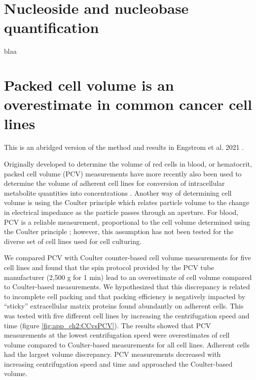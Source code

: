 \chapter{Nucleoside and nucleobase quantification}
blaa




















\chapter{Packed cell volume is an overestimate in common cancer cell lines}
\label{app_ch2_cell_vol}
This is an abridged version of the method and results in Engstrom et al. 2021 \cite{Engstrom2021-az}.

Originally developed to determine the volume of red cells in blood, or hematocrit, packed cell volume (PCV) measurements have more recently also been used to determine the volume of adherent cell lines for conversion of intracellular metabolite quantities into concentrations \cite{Park2016-ap, Liu2018-it, Yang2020-fs, Ghergurovich2020-nb}.
Another way of determining cell volume is using the Coulter principle which relates particle volume to the change in electrical impedance as the particle passes through an aperture.
For blood, PCV is a reliable measurement, proportional to the cell volume determined using the Coulter principle \cite{Carter1968-xy, Bull2001-xb}; however, this assumption has not been tested for the diverse set of cell lines used for cell culturing.

We compared PCV with Coulter counter-based cell volume measurements for five cell lines and found that the spin protocol provided by the PCV tube manufacturer (2,500 g for 1 min) lead to an overestimate of cell volume compared to Coulter-based measurements.
We hypothesized that this discrepancy is related to incomplete cell packing and that packing efficiency is negatively impacted by ``sticky'' extracellular matrix proteins found abundantly on adherent cells.
This was tested with five different cell lines by increasing the centrifugation speed and time (figure \ref{fig:app_ch2:CCvsPCV}).
The results showed that PCV measurements at the lowest centrifugation speed were overestimates of cell volume compared to Coulter-based measurements for all cell lines.
Adherent cells had the largest volume discrepancy.
PCV measurements decreased with increasing centrifugation speed and time and approached the Coulter-based volume.

